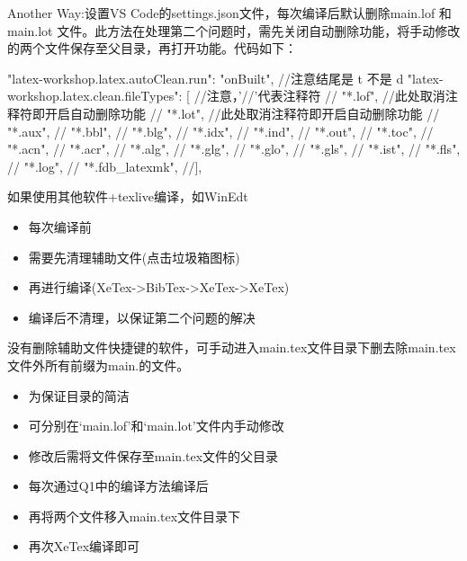 Another Way:设置{\color{blue}VS Code}的{\color{blue}settings.json}文件，每次编译后默认删除{\color{blue}main.lof}  和 {\color{blue}main.lot} 文件。此方法在处理第二个问题时，需先关闭自动删除功能，将手动修改的两个文件保存至父目录，再打开功能。代码如下：
\begin{latex}
    "latex-workshop.latex.autoClean.run": "onBuilt", //注意结尾是 t 不是 d
    "latex-workshop.latex.clean.fileTypes": [        //注意，'//'代表注释符
//  "*.lof",                           //此处取消注释符即开启自动删除功能 
//  "*.lot",                           //此处取消注释符即开启自动删除功能
//  "*.aux",
//  "*.bbl",
//  "*.blg",
//  "*.idx",
//  "*.ind",
//  "*.out",
//  "*.toc",
//  "*.acn",
//  "*.acr",
//  "*.alg",
//  "*.glg",
//  "*.glo",
//  "*.gls",
//  "*.ist",
//  "*.fls",
//  "*.log",
//  "*.fdb_latexmk",
//],
\end{latex}

如果使用其他软件+{\color{blue}texlive}编译，如{\color{blue}WinEdt}
\begin{itemize}
    \item 每次编译前
    \item 需要先清理辅助文件(点击垃圾箱图标)
    \item 再进行编译(XeTex->BibTex->XeTex->XeTex)
    \item 编译后不清理，以保证第二个问题的解决
\end{itemize}

没有删除辅助文件快捷键的软件，可手动进入{\color{blue}main.tex}文件目录下删去除{\color{blue}main.tex}文件外所有前缀为{\color{blue}main.}的文件。

\begin{itemize}
    \item 为保证目录的简洁                            
    \item 可分别在`main.lof'和`main.lot'文件内手动修改
    \item 修改后需将文件保存至{\color{blue}main.tex}文件的父目录                  
    \item 每次通过Q1中的编译方法编译后
    \item 再将两个文件移入{\color{blue}main.tex}文件目录下
    \item 再次XeTex编译即可
\end{itemize}
